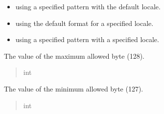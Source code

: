 \documentclass[letterpaper,10pt,english]{sphinxmanual}
\begin{document}
\begin{fulllineitems}
\begin{itemize}
\item {} 
\sphinxAtStartPar
using a specified pattern with the default locale.

\item {} 
\sphinxAtStartPar
using the default format for a specified locale.

\item {} 
\sphinxAtStartPar
using a specified pattern with a specified locale.

\end{itemize}

\begin{fulllineitems}
\label{\detokenize{apache_commons_validator_python.routines:apache_commons_validator_python.routines.byte_validator.ByteValidator.BYTE_MIN}}
\pysigstartsignatures
{}
\pysigstopsignatures
\sphinxAtStartPar
The value of the maximum allowed byte (\sphinxhyphen{}128).
\begin{quote}\begin{description}
\sphinxAtStartPar
int

\end{description}\end{quote}

\end{fulllineitems}


\begin{fulllineitems}
\label{\detokenize{apache_commons_validator_python.routines:apache_commons_validator_python.routines.byte_validator.ByteValidator.BYTE_MAX}}
\pysigstartsignatures
{}
\pysigstopsignatures
\sphinxAtStartPar
The value of the minimum allowed byte (127).
\begin{quote}\begin{description}
\sphinxAtStartPar
int

\end{description}\end{quote}


\end{fulllineitems}
\end{fulllineitems}
\end{document}
